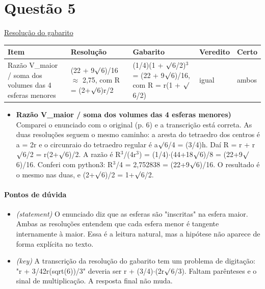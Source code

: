 \documentclass{article}%
\begin{document}
\section*{Questão 5}%
\href{https://poliedroresolve.sistemapoliedro.com.br/vestibulares/ita/2026/ita-2-fase-dia-1-28-10-2025-2-fase-dia-1/dissertativa-5-matematica-2-fase-dia-1-ita-2026}{Resolução do gabarito}\par\smallskip%
\begin{longtable}{@{}p{} p{} p{} p{} p{}@{}}\toprule Item & Resolução & Gabarito & Veredito & Certo \\ \midrule
Razão V\_maior / soma dos volumes das 4 esferas menores & (22 + 9$\surd$6)/16 $\approx$ 2,75, com R = (2+$\surd$6)r/2 & (1/4)(1 + $\surd$6/2)$^3$ = (22 + 9$\surd$6)/16, com R = r(1 + $\surd$6/2) & igual & ambos \\
\bottomrule\end{longtable}%
\begin{itemize}%
\item%
\textbf{Razão V\_maior / soma dos volumes das 4 esferas menores)} Comparei o enunciado com o original (p. 6) e a transcrição está correta. As duas resoluções seguem o mesmo caminho: a aresta do tetraedro dos centros é a = 2r e o circunraio do tetraedro regular é a$\surd$6/4 = (3/4)h. Daí R = r + r$\surd$6/2 = r(2+$\surd$6)/2. A razão é R$^3$/(4r$^3$) = (1/4)$\cdot$(44+18$\surd$6)/8 = (22+9$\surd$6)/16. Conferi com python3: R$^3$/4 = 2,752838 = (22+9$\surd$6)/16. O resultado é o mesmo nas duas, e (2+$\surd$6)/2 = 1+$\surd$6/2.%
\end{itemize}%
\paragraph{Pontos de dúvida}%
\begin{itemize}%
\item%
\textit{(statement)} O enunciado diz que as esferas são "inscritas" na esfera maior. Ambas as resoluções entendem que cada esfera menor é tangente internamente à maior. Essa é a leitura natural, mas a hipótese não aparece de forma explícita no texto.%
\item%
\textit{(key)} A transcrição da resolução do gabarito tem um problema de digitação: "r + 3/42r(sqrt(6))/3" deveria ser r + (3/4)$\cdot$(2r$\surd$6/3). Faltam parênteses e o sinal de multiplicação. A resposta final não muda.%
\end{itemize}%
\end{document}

